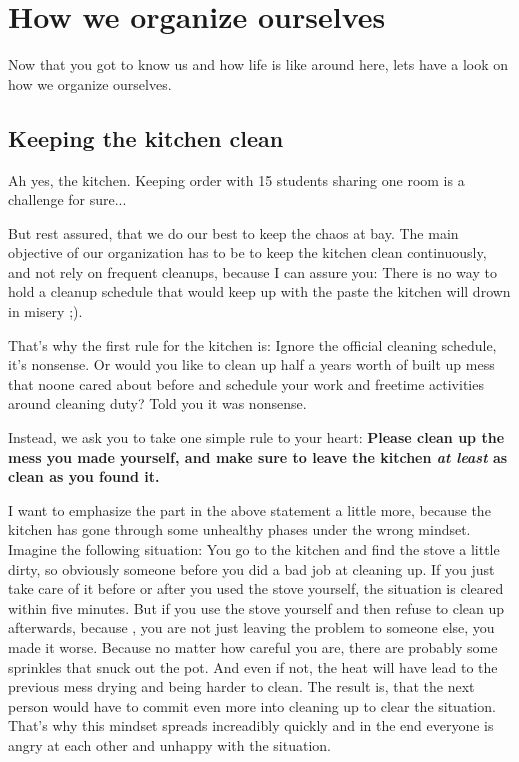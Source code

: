 \chapter{How we organize ourselves} \label{chap:organization}
Now that you got to know us and how life is like around here, lets have a look on how we organize ourselves.

\section{Keeping the kitchen clean}
Ah yes, the kitchen. Keeping order with 15 students sharing one room is a challenge for sure...

But rest assured, that we do our best to keep the chaos at bay. The main objective of our organization has to be to keep the kitchen clean continuously, and not rely on frequent cleanups, because I can assure you: There is no way to hold a cleanup schedule that would keep up with the paste the kitchen will drown in misery ;).

That's why the first rule for the kitchen is: Ignore the official cleaning schedule, it's nonsense. Or would you like to clean up half a years worth of built up mess that noone cared about before and schedule your work and freetime activities around cleaning duty? Told you it was nonsense.

Instead, we ask you to take one simple rule to your heart: \textbf{Please clean up the mess you made yourself, and make sure to leave the kitchen \textit{at least} as clean as you found it.}

I want to emphasize the  part in the above statement a little more, because the kitchen has gone through some unhealthy phases under the wrong mindset. Imagine the following situation: You go to the kitchen and find the stove a little dirty, so obviously someone before you did a bad job at cleaning up. If you just take care of it before or after you used the stove yourself, the situation is cleared within five minutes. But if you use the stove yourself and then refuse to clean up afterwards, because , you are not just leaving the problem to someone else, you made it worse. Because no matter how careful you are, there are probably some sprinkles that snuck out the pot. And even if not, the heat will have lead to the previous mess drying and being harder to clean. The result is, that the next person would have to commit even more into cleaning up to clear the situation. That's why this mindset spreads increadibly quickly and in the end everyone is angry at each other and unhappy with the situation.

